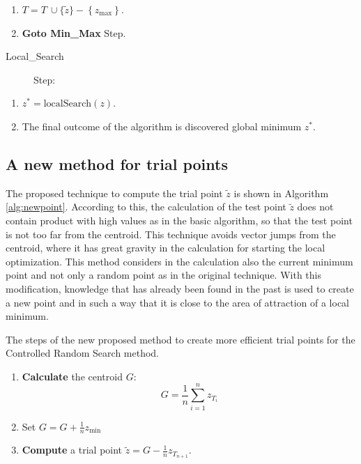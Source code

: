 \documentclass[symmetry,article,submit,moreauthors,pdftex]{mdpi}
\begin{document}
\begin{algorithm}
\begin{description}
\end{description}
\begin{enumerate}
\item $T=T\ \cup\{\tilde{z}\}-\left\{ z_{\mbox{max}}\right\} $.
\item \textbf{Goto Min\_Max} Step.
\end{enumerate}
\begin{description}
\item [{Local\_Search}] Step:
\end{description}
\begin{enumerate}
\item $z^{*}=\mbox{localSearch}(z)$.
\item The final outcome of the algorithm is discovered global minimum $z^{*}$.
\end{enumerate}
\end{algorithm}


\subsection{A new method for trial points\label{subsec:A-new-method}}
The proposed technique to compute the trial point $\tilde{z}$ is
shown in Algorithm \ref{alg:newpoint}. 
According to this, the calculation of the test point $\tilde{z}$ does not contain product with high
values as in the basic algorithm, so that the test point is not too
far from the centroid. This technique avoids vector jumps from the
centroid, where it has great gravity in the calculation for starting
the local optimization. This method considers in the calculation also the current minimum point and not only a random point as in the original technique. With this modification, knowledge that has already been found in the past is used to create a new point and in such a way that it is close to the area of attraction of a local minimum. 

\begin{algorithm}

\caption{The steps of the new proposed method to create more efficient trial points for the Controlled Random Search method.\label{alg:newpoint}}

\begin{enumerate}
\item \textbf{Calculate} the centroid $G$: 
\[
G=\frac{1}{n}\sum_{i=1}^{n}z_{T_{i}}
\]
\item Set $G=G+\frac{1}{n}z_{\mbox{min}}$
\item \textbf{Compute} a trial point $\tilde{z}=G-\frac{1}{n}z_{T_{n+1}}$.
\end{enumerate}
\end{algorithm}
\end{document}
